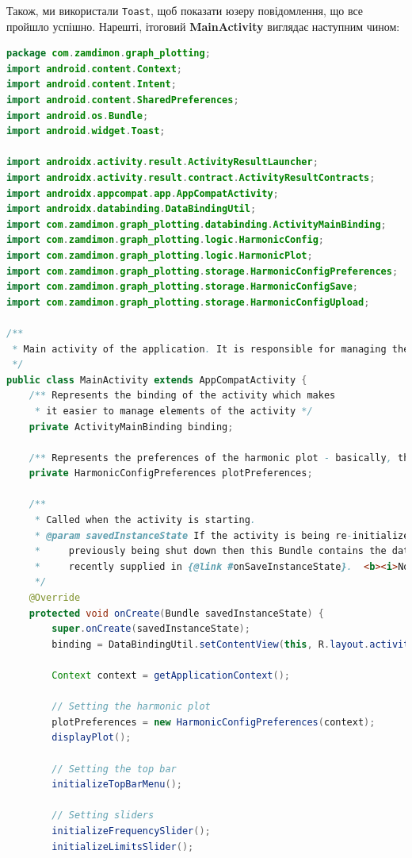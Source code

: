 \documentclass[oneside,solution]{android-assign}
\begin{document}
Також, ми використали \texttt{Toast}, щоб показати юзеру повідомлення, що все пройшло успішно. Нарешті, ітоговий \textbf{MainActivity} виглядає наступним чином:
\begin{lstlisting}[language=java]
package com.zamdimon.graph_plotting;
import android.content.Context;
import android.content.Intent;
import android.content.SharedPreferences;
import android.os.Bundle;
import android.widget.Toast;

import androidx.activity.result.ActivityResultLauncher;
import androidx.activity.result.contract.ActivityResultContracts;
import androidx.appcompat.app.AppCompatActivity;
import androidx.databinding.DataBindingUtil;
import com.zamdimon.graph_plotting.databinding.ActivityMainBinding;
import com.zamdimon.graph_plotting.logic.HarmonicConfig;
import com.zamdimon.graph_plotting.logic.HarmonicPlot;
import com.zamdimon.graph_plotting.storage.HarmonicConfigPreferences;
import com.zamdimon.graph_plotting.storage.HarmonicConfigSave;
import com.zamdimon.graph_plotting.storage.HarmonicConfigUpload;

/**
 * Main activity of the application. It is responsible for managing the UI and the logic of the application.
 */
public class MainActivity extends AppCompatActivity {
    /** Represents the binding of the activity which makes
     * it easier to manage elements of the activity */
    private ActivityMainBinding binding;

    /** Represents the preferences of the harmonic plot - basically, the settings */
    private HarmonicConfigPreferences plotPreferences;

    /**
     * Called when the activity is starting.
     * @param savedInstanceState If the activity is being re-initialized after
     *     previously being shut down then this Bundle contains the data it most
     *     recently supplied in {@link #onSaveInstanceState}.  <b><i>Note: Otherwise it is null.</i></b>
     */
    @Override
    protected void onCreate(Bundle savedInstanceState) {
        super.onCreate(savedInstanceState);
        binding = DataBindingUtil.setContentView(this, R.layout.activity_main);

        Context context = getApplicationContext();

        // Setting the harmonic plot
        plotPreferences = new HarmonicConfigPreferences(context);
        displayPlot();

        // Setting the top bar
        initializeTopBarMenu();

        // Setting sliders
        initializeFrequencySlider();
        initializeLimitsSlider();


\end{lstlisting}
\end{document}
